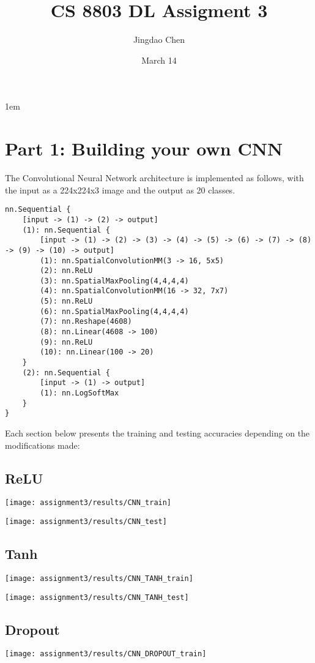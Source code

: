 \documentclass[twoside,12pt]{article}
\newcommand{\imsize}{0.5\linewidth}
\begin{document}
\title{CS 8803 DL Assigment 3}
\author{Jingdao Chen}
\date{March 14}
\maketitle
\openup 1em

\section*{Part 1: Building your own CNN}

The Convolutional Neural Network architecture is implemented as follows,
with the input as a 224x224x3 image and the output as 20 classes.

\begin{verbatim}
nn.Sequential {
	[input -> (1) -> (2) -> output]
	(1): nn.Sequential {
		[input -> (1) -> (2) -> (3) -> (4) -> (5) -> (6) -> (7) -> (8) -> (9) -> (10) -> output]
		(1): nn.SpatialConvolutionMM(3 -> 16, 5x5)
		(2): nn.ReLU
		(3): nn.SpatialMaxPooling(4,4,4,4)
		(4): nn.SpatialConvolutionMM(16 -> 32, 7x7)
		(5): nn.ReLU
		(6): nn.SpatialMaxPooling(4,4,4,4)
		(7): nn.Reshape(4608)
		(8): nn.Linear(4608 -> 100)
		(9): nn.ReLU
		(10): nn.Linear(100 -> 20)
	}
	(2): nn.Sequential {
		[input -> (1) -> output]
		(1): nn.LogSoftMax
	}
}
\end{verbatim}

Each section below presents the training and testing accuracies depending on the modifications made:

\subsection*{ReLU}
\texttt{[image: assignment3/results/CNN\_train]}

\texttt{[image: assignment3/results/CNN\_test]}

\subsection*{Tanh}
\texttt{[image: assignment3/results/CNN\_TANH\_train]}

\texttt{[image: assignment3/results/CNN\_TANH\_test]}

\subsection*{Dropout}
\texttt{[image: assignment3/results/CNN\_DROPOUT\_train]}
\end{document}
